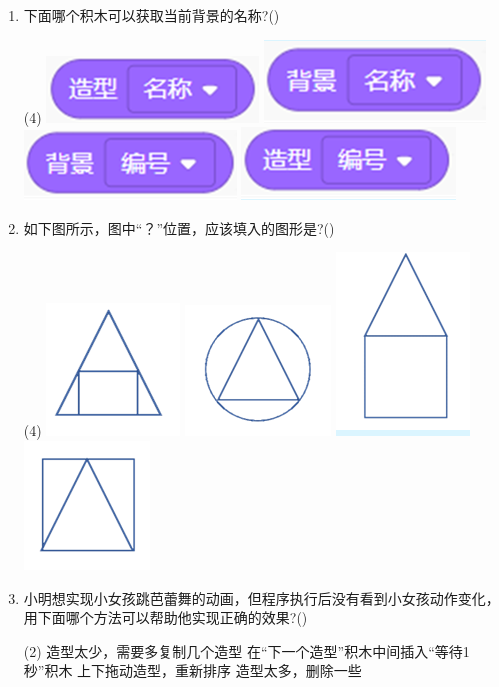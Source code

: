 \documentclass[10pt, a4paper]{article}
\begin{document}
\begin{enumerate}
        \item 下面哪个积木可以获取当前背景的名称?(\qquad)
        \begin{tasks}(4)
            \task \includegraphics[width=.12\textwidth]{17a.png}
            \task \includegraphics[width=.12\textwidth]{17b.png}
            \task \includegraphics[width=.12\textwidth]{17c.png}
            \task \includegraphics[width=.12\textwidth]{17d.png}
        \end{tasks}

        \item 如下图所示，图中“？”位置，应该填入的图形是?(\qquad)
        \begin{tasks}(4)
            \task \includegraphics[width=.05\textwidth]{18a.png}
            \task \includegraphics[width=.05\textwidth]{18b.png}
            \task \includegraphics[width=.05\textwidth]{18c.png}
            \task \includegraphics[width=.05\textwidth]{18d.png}
        \end{tasks}

        \item 小明想实现小女孩跳芭蕾舞的动画，但程序执行后没有看到小女孩动作变化，用下面哪个方法可以帮助他实现正确的效果?(\qquad)
        \begin{tasks}(2)
            \task 造型太少，需要多复制几个造型
            \task 在“下一个造型”积木中间插入“等待1秒”积木
            \task 上下拖动造型，重新排序
            \task 造型太多，删除一些
        \end{tasks}


\end{enumerate}
\end{document}
